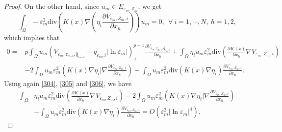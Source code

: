 \documentclass[10pt,a4paper]{amsart}
\begin{document}
\begin{proof}
On the other hand, since $ u_m\in E_{\varepsilon_m,Z_m} $, we get
\begin{equation*}
\int_{\Omega}-\varepsilon_m^2\text{div}\left( K(x)\nabla \left( \eta_i\frac{\partial V_{\varepsilon_m, Z_{m}, i}}{\partial x_\hbar}\right)\right)  u_m=0,\ \ \forall\ i=1,\cdots,N,\  \hbar=1,2,
\end{equation*}
which implies that
\begin{equation}\label{209}
\begin{split}
0%
=&p\int_{\Omega}u_m\left( V_{\varepsilon_m, z_{m,i}, \hat{q}_{\varepsilon_m,i}}-\hat{q}_{\varepsilon_m,i}|\ln\varepsilon_m|\right)^{p-1}_+\frac{\partial V_{\varepsilon_m, z_{m,i}, \hat{q}_{\varepsilon_m,i}}}{\partial x_\hbar}+\int_{\Omega}\eta_iu_m\varepsilon_m^2\text{div}\left (\frac{\partial K(x)}{\partial x_\hbar}\nabla V_{\varepsilon_m, Z_{m},i}  \right )\\
&-2\int_{\Omega}u_m\varepsilon_m^2\left (K(x)\nabla\eta_i|\nabla   \frac{\partial V_{\varepsilon_m, Z_{m},i}}{\partial x_\hbar}  \right ) -\int_{\Omega}u_m\varepsilon_m^2\text{div}\left (K(x)\nabla   \eta_i  \right )\frac{\partial V_{\varepsilon_m, Z_{m},i}}{\partial x_\hbar}.
\end{split}
\end{equation}
Using again \eqref{304}, \eqref{305} and \eqref{306}, we have
\begin{equation}\label{209-1}
\begin{split}
\int_{\Omega}&\eta_iu_m\varepsilon_m^2\text{div}\left (\frac{\partial K(x)}{\partial x_\hbar}\nabla V_{\varepsilon_m, Z_{m},i}  \right )-2\int_{\Omega}u_m\varepsilon_m^2\left (K(x)\nabla\eta_i|\nabla   \frac{\partial V_{\varepsilon_m, Z_{m},i}}{\partial x_\hbar}  \right ) \\
&-\int_{\Omega}u_m\varepsilon_m^2\text{div}\left (K(x)\nabla   \eta_i  \right )\frac{\partial V_{\varepsilon_m, Z_{m},i}}{\partial x_\hbar}
=O\left( \varepsilon_m^2|\ln\varepsilon_m|^{4}\right).
\end{split}
\end{equation}

\end{proof}
\end{document}
